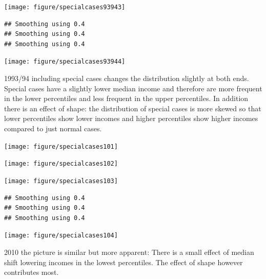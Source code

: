 \documentclass[twoside]{article}\usepackage[]{graphicx}\usepackage[]{color}
\makeatletter
\newenvironment{kframe}{%
 \def\at@end@of@kframe{}%
 \ifinner\ifhmode%
  \def\at@end@of@kframe{\end{minipage}}%
  \begin{minipage}{\columnwidth}%
 \fi\fi%
 \def\FrameCommand##1{\hskip\@totalleftmargin \hskip-\fboxsep
 \colorbox{shadecolor}{##1}\hskip-\fboxsep
     \hskip-\linewidth \hskip-\@totalleftmargin \hskip\columnwidth}%
 \MakeFramed {\advance\hsize-\width
   \@totalleftmargin\z@ \linewidth\hsize
   \@setminipage}}%
 {\par\unskip\endMakeFramed%
 \at@end@of@kframe}
\newenvironment{knitrout}{}{} %
\makeatother
\begin{document}
\begin{multicols}{2}
\begin{knitrout}
\texttt{[image: figure/specialcases93943]} 
\begin{kframe}\begin{verbatim}
## Smoothing using 0.4
## Smoothing using 0.4
## Smoothing using 0.4
\end{verbatim}
\end{kframe}
\texttt{[image: figure/specialcases93944]} 

\end{knitrout}

1993/94 including special cases changes the distribution slightly at both ends. Special cases have a slightly lower median income and therefore are more frequent in the lower percentiles and less frequent in the upper percentiles. In addition there is an effect of shape: the distribution of special cases is more skewed so that lower percentiles show lower incomes and higher percentiles show higher incomes compared to just normal cases.

\begin{knitrout}
\color{fgcolor}
\texttt{[image: figure/specialcases101]} 

\texttt{[image: figure/specialcases102]} 

\texttt{[image: figure/specialcases103]} 
\begin{kframe}\begin{verbatim}
## Smoothing using 0.4
## Smoothing using 0.4
## Smoothing using 0.4
\end{verbatim}
\end{kframe}
\texttt{[image: figure/specialcases104]} 

\end{knitrout}

2010 the picture is similar but more apparent: There is a small effect of median shift lowering incomes in the lowest percentiles. The effect of shape however contributes most.







\end{multicols}
\end{document}
